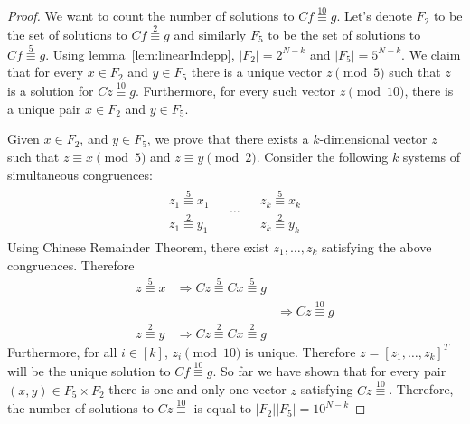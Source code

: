 \documentclass{article}
\newcommand{\transp}[1]{#1^T}
\begin{document}
\begin{proof}
   	
We want to count the number of solutions to $C{f} \overset{10}{\equiv}{g}$. Let's denote $F_2$ to be the set of solutions to $Cf\overset{2}{\equiv}g$ and similarly $F_5$ to be the set of solutions to $Cf\overset{5}{\equiv}g$. Using lemma~\ref{lem:linearIndepp}, $|F_2|=2^{N-k}$ and $|F_5|=5^{N-k}$. We claim that for every $x\in F_2$ and $y \in F_5$ there is a unique vector $z\pmod{5}$ such that $z$ is a solution for $Cz\overset{10}{\equiv}g$. Furthermore, for every such vector $z\pmod{10}$, there is a unique pair $x\in F_2$ and $y\in F_5$. 
 
Given $x\in F_2$, and $y\in F_5$, we prove that there exists a $k$-dimensional vector ${z}$ such that ${z}\equiv{x}\pmod{5}$ and ${z}\equiv{y}\pmod{2}$. Consider the following $k$ systems of simultaneous congruences:
$$
\begin{array}{lcr}
\begin{array}{l}
{z}_1\overset{5}{\equiv} {x}_1\\
{z}_1\overset{2}{\equiv} {y}_1
\end{array} &
\begin{array}{c}
\ldots
\end{array}&
\begin{array}{r}
{z}_k\overset{5}{\equiv} {x}_k\\
{z}_k\overset{2}{\equiv} {y}_k
\end{array}
	
\end{array}
$$
Using Chinese Remainder Theorem, there exist ${z}_1,\ldots,{z}_k$ satisfying the above congruences. Therefore
$$
\begin{array}{lrr}
z \overset{5}{\equiv} x  & \Rightarrow Cz \overset{5}{\equiv} Cx\overset{5}{\equiv} g &\\
& & \Rightarrow Cz \overset{10}{\equiv} g \\

z \overset{2}{\equiv} y  &\Rightarrow Cz \overset{2}{\equiv} Cx\overset{2}{\equiv} g &
\end{array}
$$
 Furthermore, for all $i\in[k]$, ${z}_i\pmod{10}$ is unique. Therefore $z=[z_1,\ldots,z_k]\transp{}$ will be the unique solution to $Cf\overset{10}{\equiv}g$. So far we have shown that for every pair $(x,y)\in F_5\times F_2$ there is one and only one vector $z$ satisfying $Cz\overset{10}{\equiv}$. Therefore, the number of solutions to $Cz\overset{10}{\equiv}$ is equal to $|F_2||F_5|=10^{N-k}$ 
\end{proof}
\end{document}
